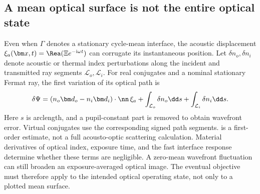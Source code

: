 \subsection{A mean optical surface is not the entire optical state}
Even when $\Gamma$ denotes a stationary cycle-mean interface, the acoustic
displacement $\xi_a(\bm x,t)=\Rea(\Xi e^{-\mathrm i\omega t})$ can corrugate
its instantaneous position. Let $\delta n_o,\delta n_i$ denote acoustic or
thermal index perturbations along the incident and transmitted ray segments
$\mathcal L_o,\mathcal L_i$. For real conjugates and a nominal stationary
Fermat ray, the first variation of its optical path is
\begin{equation}
 \delta\Psi=(n_o\bm d_o-n_i\bm d_i)\cdot\nn\,\xi_a
       +\int_{\mathcal L_o}\delta n_o\dd s
       +\int_{\mathcal L_i}\delta n_i\dd s.
 \label{eq:fast-optical-error}
\end{equation}
Here $s$ is arclength, and a pupil-constant part is removed to obtain wavefront
error. Virtual conjugates use the corresponding signed path segments.
 is a first-order estimate, not a full
acousto-optic scattering calculation. Material derivatives of optical index,
exposure time, and the fast interface response determine whether these terms
are negligible. A zero-mean wavefront fluctuation can still broaden an
exposure-averaged optical image. The eventual objective must therefore apply
to the intended optical operating state, not only to a plotted mean surface.
